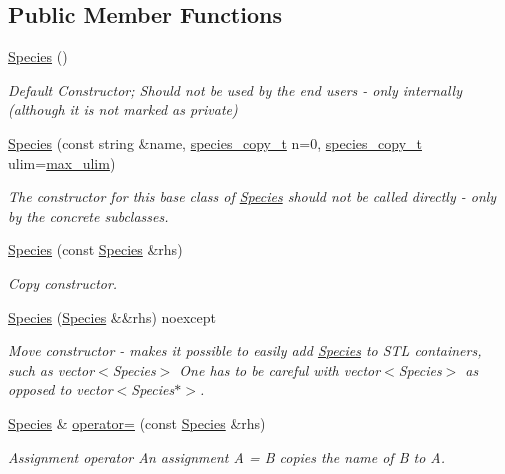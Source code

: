 \subsection*{Public Member Functions}
\begin{DoxyCompactItemize}
\item 
\hyperlink{classSpecies_abb0f8e3208b0cc676157b7dff837c0be}{Species} ()
\begin{DoxyCompactList}\small\item\em Default Constructor; Should not be used by the end users -\/ only internally (although it is not marked as private) \end{DoxyCompactList}\item 
\hyperlink{classSpecies_a7c18ebc80eac720b2ee560a89587c13e}{Species} (const string \&name, \hyperlink{common_8h_a3503f321fd36304ee274141275cca586}{species\+\_\+copy\+\_\+t} n=0, \hyperlink{common_8h_a3503f321fd36304ee274141275cca586}{species\+\_\+copy\+\_\+t} ulim=\hyperlink{common_8h_adaf831a0b61083f29adf8fc6e8edab35}{max\+\_\+ulim})
\begin{DoxyCompactList}\small\item\em The constructor for this base class of \hyperlink{classSpecies}{Species} should not be called directly -\/ only by the concrete subclasses. \end{DoxyCompactList}\item 
\hyperlink{classSpecies_abfe20eea461a75aa2a5dce130480e9ce}{Species} (const \hyperlink{classSpecies}{Species} \&rhs)
\begin{DoxyCompactList}\small\item\em Copy constructor. \end{DoxyCompactList}\item 
\hyperlink{classSpecies_a0d8e3ec67f5d9d850237209763c46740}{Species} (\hyperlink{classSpecies}{Species} \&\&rhs) noexcept
\begin{DoxyCompactList}\small\item\em Move constructor -\/ makes it possible to easily add \hyperlink{classSpecies}{Species} to S\+T\+L containers, such as vector$<$\+Species$>$ One has to be careful with vector$<$\+Species$>$ as opposed to vector$<$\+Species$\ast$$>$. \end{DoxyCompactList}\item 
\hyperlink{classSpecies}{Species} \& \hyperlink{classSpecies_a0b0b78927bd86d5c46c6c58afd5fcf13}{operator=} (const \hyperlink{classSpecies}{Species} \&rhs)
\begin{DoxyCompactList}\small\item\em Assignment operator An assignment A = B copies the name of B to A. \end{DoxyCompactList}\item 

\end{DoxyCompactItemize}
